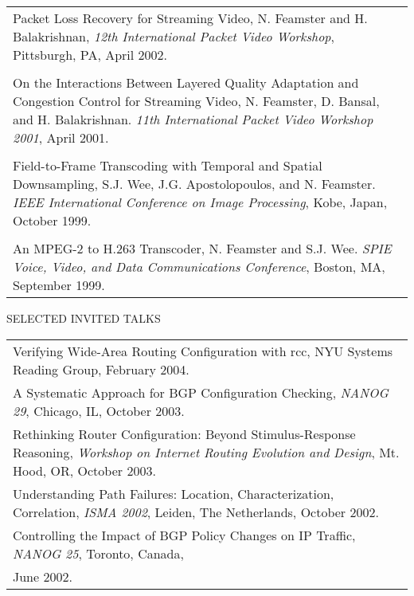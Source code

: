 \documentclass{article}
\begin{document}
\begin{flushleft}
\begin{tabular}{p{7 in}}
{\sc Packet Loss Recovery for Streaming Video}, N. Feamster and
H. Balakrishnan, {\it 12th International Packet Video Workshop}, Pittsburgh, PA, April 2002.  \\ \\ 

{\sc On the Interactions Between Layered Quality Adaptation and
Congestion Control for Streaming Video}, N. Feamster, D. Bansal, and
H. Balakrishnan. {\it 11th International Packet Video Workshop 2001},
April 2001. \\ \\

{\sc Field-to-Frame Transcoding with Temporal and
Spatial Downsampling}, S.J. Wee, J.G. Apostolopoulos, and
N. Feamster. {\it IEEE International Conference on Image
Processing}, Kobe, Japan, October 1999.\\ \\

{\sc An MPEG-2 to H.263 Transcoder}, N. Feamster
and S.J. Wee. {\it SPIE Voice, Video, and Data Communications
Conference}, Boston, MA, September 1999.
\end{tabular}


\vspace{0.15 in}
{\ag SELECTED INVITED TALKS \hrulefill } \\
\vspace{0.1 in}
\begin{tabular}{p{7 in}}
{\sc Verifying Wide-Area Routing Configuration with rcc}, NYU Systems
Reading Group, February 2004. \\ 
{\sc A Systematic Approach for BGP Configuration Checking}, {\it
NANOG 29}, Chicago, IL, October 2003. \\ 
{\sc Rethinking Router Configuration: Beyond Stimulus-Response Reasoning}, {\it
Workshop on Internet Routing Evolution and Design}, Mt. Hood, OR, October
2003. \\  
{\sc Understanding Path Failures: Location, Characterization,
  Correlation}, {\it 
ISMA 2002}, Leiden, The Netherlands, October 2002. \\ 
{\sc Controlling the Impact of BGP Policy Changes on IP Traffic}, {\it
NANOG 25}, Toronto, Canada, \\June 2002.
\end{tabular}



\end{flushleft}
\end{document}
